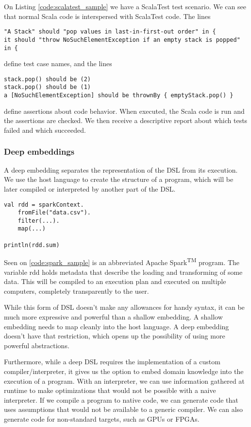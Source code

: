 On Listing \ref{code:scalatest_sample} we have a ScalaTest test scenario. We can see that normal Scala code is interspersed with ScalaTest code.
The lines
\begin{verbatim}
"A Stack" should "pop values in last-in-first-out order" in {
it should "throw NoSuchElementException if an empty stack is popped" in {
\end{verbatim}
define test case names, and the lines
\begin{verbatim}
stack.pop() should be (2)
stack.pop() should be (1)
a [NoSuchElementException] should be thrownBy { emptyStack.pop() }
\end{verbatim}
define assertions about code behavior. When executed, the Scala code is run and the assertions are checked. We then receive a descriptive report about which tests failed and which succeeded.


\subsubsection{Deep embeddings}

A deep embedding separates the representation of the DSL from its execution. We use the host language to create the structure of a program, which will be later compiled or interpreted by another part of the DSL.

\begin{lstlisting}[caption=Sample spark code, label=code:spark_sample]
val rdd = sparkContext.
	fromFile("data.csv").
	filter(...).
	map(...)

println(rdd.sum)
\end{lstlisting}

Seen on \ref{code:spark_sample} is an abbreviated Apache Spark\textsuperscript{TM} program. The variable rdd holds metadata that describe the loading and transforming of some data. This will be compiled to an execution plan and executed on multiple computers, completely transparently to the user.

While this form of DSL doesn't make any allowances for handy syntax, it can be much more expressive and powerful than a shallow embedding. A shallow embedding needs to map cleanly into the host language. A deep embedding doesn't have that restriction, which opens up the possibility of using more powerful abstractions.

Furthermore, while a deep DSL requires the implementation of a custom compiler/interpreter, it gives us the option to embed domain knowledge into the execution of a program. With an interpreter, we can use information gathered at runtime to make optimizations that would not be possible with a naive interpreter. If we compile a program to native code, we can generate code that uses assumptions that would not be available to a generic compiler. We can also generate code for non-standard targets, such as GPUs or FPGAs.
